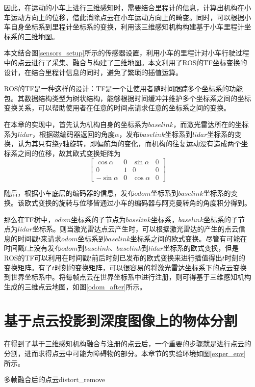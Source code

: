 因此，在运动的小车上进行三维感知时，需要结合里程计的信息，计算出机构在小车运动方向上的位移，借此消除点云在小车运动方向上的畸变。同时，可以根据小车自身坐标系到里程计坐标系的变换，利用该三维感知机构构建基于小车里程计坐标系的三维地图。

本文结合图\ref{sensors_setup}所示的传感器设置，利用小车的里程计对小车行驶过程中的点云进行了采集、融合与构建了三维地图。本文利用了ROS的TF坐标变换的设计，在结合里程计信息的同时，避免了繁琐的插值运算。

ROS的TF是一种这样的设计：TF是一个让使用者随时间跟踪多个坐标系的功能包。其数据结构类型为树状结构，能够根据时间缓冲并维护多个坐标系之间的坐标变换关系，可以帮助使用者在任意的时间点请求任意的坐标系之间的变换。

在本章的实现中，首先认为机构自身的坐标系为$baselink$，而激光雷达所在的坐标系为$lidar$，根据磁编码器返回的角度$\alpha$，发布$baselink$坐标系到$lidar$坐标系的变换，认为其只有绕y轴旋转，即偏航角的变化，而机构的往复运动没有造成两个坐标系之间的位移，故其欧式变换矩阵为
$$
\begin{bmatrix}
    \cos \alpha & 0 & \sin \alpha & 0\\
    0 & 1& 0 & 0\\
    -\sin \alpha & 0 & \cos \alpha & 0 
\end{bmatrix}
$$

随后，根据小车底层的编码器的信息，发布$odom$坐标系到$baselink$坐标系的变换。该欧式变换的旋转与位移皆通过小车的编码器与阿克曼转角的角度积分得到。


那么在TF树中，$odom$坐标系的子节点为$baselink$坐标系，$baselink$坐标系的子节点为$lidar$坐标系。则当激光雷达点云产生时，可以根据激光雷达的产生的点云信息的时间戳$t$来请求$odom$坐标系到$baselink$坐标系之间的欧式变换。尽管有可能在时间戳$t$上没有发布$odom$到$baselink$、$baselink$到$lidar$坐标系的欧式变换，但是ROS的TF可以利用在时间戳$t$前后时刻已发布的欧式变换来进行插值得出$t$时刻的变换矩阵。有了$t$时刻的变换矩阵，可以很容易的将激光雷达坐标系下的点云变换到世界坐标系中。将每帧点云在世界坐标系中进行注册，则可得基于三维感知机构生成的三维点云地图，如图\ref{odom_after}所示。

\section{基于点云投影到深度图像上的物体分割}

在得到了基于三维感知机构融合与注册的点云后，一个重要的步骤就是进行点云的分割，进而求得点云中可能为障碍物的部分。本章节的实验环境如图\ref{exper_env}所示。
\begin{pics}[htbp]{多帧融合后的点云}{distort_remove}
\end{pics}

